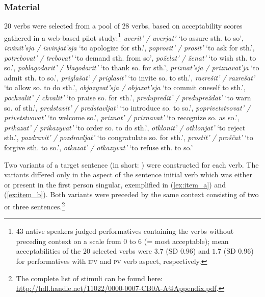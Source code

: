 \documentclass[output=paper,colorlinks,citecolor=brown,newtxmath,hidelinks]{langscibook}
\begin{document}
\subsubsection{Material}

20 verbs were selected from a pool of 28  verbs, based on acceptability scores gathered in a web-based pilot study:\footnote{43  native speakers judged performatives containing the verbs without preceding context on a scale from 0 to 6 (= most acceptable); mean acceptabilities of the 20 selected verbs were $3.7$ (SD $0.96$) and $1.7$ (SD $0.96$) for performatives with \textsc{ipv} and \textsc{pv} verb aspect, respectively.} 
\textit{uverit' / uverjat'} ‘to assure sth. to so’, 
\textit{izvinit'sja / izvinjat'sja} ‘to apologize for sth.’, 
\textit{poprosit' / prosit'} ‘to ask for sth.’, 
\textit{potrebovat' / trebovat'} ‘to demand sth. from so’, 
\textit{poželat' / ženat'} ‘to wish sth. to so.’, 
\textit{poblagodarit' / blagodarit'} ‘to thank so. for sth.’, 
\textit{priznat'sja / priznavat'ja} ‘to admit sth. to so.’, 
\textit{priglašat' / priglasit'} ‘to invite so. to sth.’, 
\textit{razrešit' / razrešat'} ‘to allow so. to do sth.’, 
\textit{objazyvat'sja / objazat'sja} ‘to commit oneself to sth.’, 
\textit{pochvalit' / chvalit'} ‘to praise so. for sth.’, 
\textit{predupredit' / predupreždat'} ‘to warn so. of sth.’, 
\textit{predstavit' / predstavljat'} ‘to introduce so. to so.’, \textit{poprivetstvovat' / privetstvovat'} ‘to welcome so.’, 
\textit{priznat' / priznavat'} ‘to recognize so. as so.’, 
\textit{prikazat' / prikazyvat'} ‘to order so. to do sth.’, 
\textit{otklonit' / otklonjat'} ‘to reject sth.’, 
\textit{pozdravit' / pozdravljat'} ‘to congratulate so. for sth.’, 
\textit{prostit' / proščat'} ‘to forgive sth. to so.’, 
\textit{otkazat' / otkazyvat'} ‘to refuse sth. to so.’

Two variants of a  target sentence (in short: ) were constructed for each verb. The variants differed only in the aspect of the sentence initial verb which was either  or  present in the first person singular, exemplified in (\ref{ex:item_a}) and (\ref{ex:item_b}). Both  variants were preceded by the same context consisting of two or three sentences.\footnote{The complete list of stimuli can be found here: \url{http://hdl.handle.net/11022/0000-0007-CB0A-A@Appendix.pdf}.\label{fn:app}}
\end{document}
